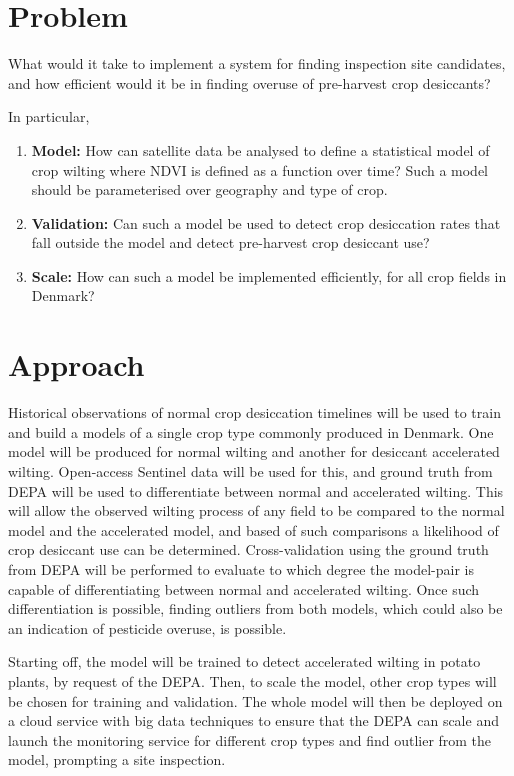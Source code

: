 \section{Problem}
What would it take to implement a system for finding inspection site candidates, and how efficient would it be in finding overuse of pre-harvest crop desiccants?
\vspace{1em}

\noindent In particular,
\begin{enumerate}
    \item \textbf{Model:} How can satellite data be analysed to define a statistical model of crop wilting where NDVI is defined as a function over time? Such a model should be parameterised over geography and type of crop.
    \item \textbf{Validation:} Can such a model be used to detect crop desiccation rates that fall outside the model and detect pre-harvest crop desiccant use?
    \item \textbf{Scale:} How can such a model be implemented efficiently, for all crop fields in Denmark?
\end{enumerate}

\section{Approach}
Historical observations of normal crop desiccation timelines will be used to train and build a models of a single crop type commonly produced in Denmark.
One model will be produced for normal wilting and another for desiccant accelerated wilting. Open-access Sentinel data will be used for this, and ground truth from DEPA will be used to differentiate between normal and accelerated wilting.
This will allow the observed wilting process of any field to be compared to the normal model and the accelerated model, and based of such comparisons a likelihood of crop desiccant use can be determined.
Cross-validation using the ground truth from DEPA will be performed to evaluate to which degree the model-pair is capable of differentiating between normal and accelerated wilting. Once such differentiation is possible, finding outliers from both models, which could also be an indication of pesticide overuse, is possible.

Starting off, the model will be trained to detect accelerated wilting in potato plants, by request of the DEPA. Then, to scale the model, other crop types will be chosen for training and validation. The whole model will then be deployed on a cloud service with big data techniques to ensure that the DEPA can scale and launch the monitoring service for different crop types and find outlier from the model, prompting a site inspection.


